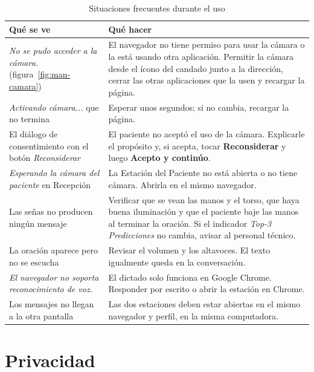\begin{table}[H]
  \centering
  \caption{Situaciones frecuentes durante el uso}\label{tab:man-errores}
  \small
  \begin{tabularx}{\textwidth}{>{\raggedright\arraybackslash}p{4.4cm} X}
    \toprule
    \textbf{Qué se ve} & \textbf{Qué hacer} \\
    \midrule
    \emph{No se pudo acceder a la cámara.} (figura~\ref{fig:man-camara}) & El navegador no tiene permiso para usar la cámara o la está usando otra aplicación. Permitir la cámara desde el ícono del candado junto a la dirección, cerrar las otras aplicaciones que la usen y recargar la página. \\
    \emph{Activando cámara...} que no termina & Esperar unos segundos; si no cambia, recargar la página. \\
    El diálogo de consentimiento con el botón \emph{Reconsiderar} & El paciente no aceptó el uso de la cámara. Explicarle el propósito y, si acepta, tocar \textbf{Reconsiderar} y luego \textbf{Acepto y continúo}. \\
    \emph{Esperando la cámara del paciente} en Recepción & La Estación del Paciente no está abierta o no tiene cámara. Abrirla en el mismo navegador. \\
    Las señas no producen ningún mensaje & Verificar que se vean las manos y el torso, que haya buena iluminación y que el paciente baje las manos al terminar la oración. Si el indicador \emph{Top-3 Predicciones} no cambia, avisar al personal técnico. \\
    La oración aparece pero no se escucha & Revisar el volumen y los altavoces. El texto igualmente queda en la conversación. \\
    \emph{El navegador no soporta reconocimiento de voz.} & El dictado solo funciona en Google Chrome. Responder por escrito o abrir la estación en Chrome. \\
    Los mensajes no llegan a la otra pantalla & Las dos estaciones deben estar abiertas en el mismo navegador y perfil, en la misma computadora. \\
    \bottomrule
  \end{tabularx}
\end{table}


\section{Privacidad}

